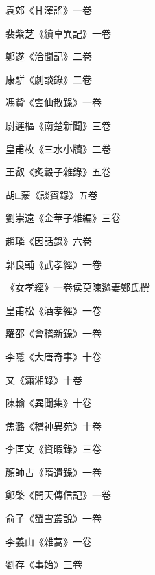 \begin{pinyinscope}
 袁郊《甘澤謠》一卷



 裴紫芝《續卓異記》一卷



 鄭遂《洽聞記》二卷



 康駢《劇談錄》二卷



 馮贄《雲仙散錄》一卷



 尉遲樞《南楚新聞》三卷



 皇甫枚《三水小牘》二卷



 王叡《炙轂子雜錄》五卷



 胡□蒙《談賓錄》五卷



 劉崇遠《金華子雜編》三卷



 趙璘《因話錄》六卷



 郭良輔《武孝經》一卷



 《女孝經》一卷侯莫陳邈妻鄭氏撰



 皇甫松《酒孝經》一卷



 羅邵《會稽新錄》一卷



 李隱《大唐奇事》十卷



 又《瀟湘錄》十卷



 陳輸《異聞集》十卷



 焦潞《稽神異苑》十卷



 李匡文《資暇錄》三卷



 顏師古《隋遺錄》一卷



 鄭棨《開天傳信記》一卷



 俞子《螢雪叢說》一卷



 李義山《雜蒿》一卷



 劉存《事始》三卷




\end{pinyinscope}
